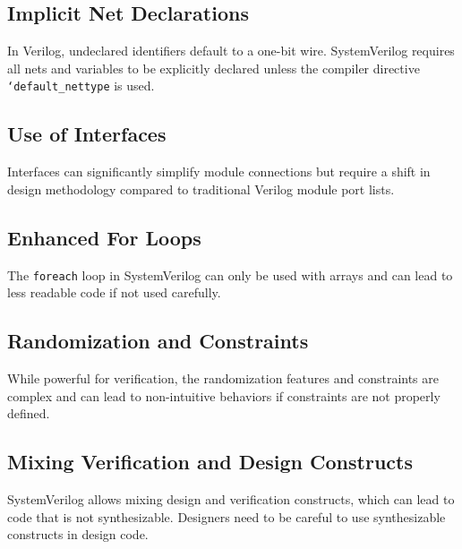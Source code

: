 \subsection{Implicit Net Declarations}
In Verilog, undeclared identifiers default to a one-bit wire. SystemVerilog requires all nets and variables to be explicitly declared unless the compiler directive \texttt{`default\_nettype} is used.

\subsection{Use of Interfaces}
Interfaces can significantly simplify module connections but require a shift in design methodology compared to traditional Verilog module port lists.

\subsection{Enhanced For Loops}
The \texttt{foreach} loop in SystemVerilog can only be used with arrays and can lead to less readable code if not used carefully.

\subsection{Randomization and Constraints}
While powerful for verification, the randomization features and constraints are complex and can lead to non-intuitive behaviors if constraints are not properly defined.

\subsection{Mixing Verification and Design Constructs}
SystemVerilog allows mixing design and verification constructs, which can lead to code that is not synthesizable. Designers need to be careful to use synthesizable constructs in design code.




